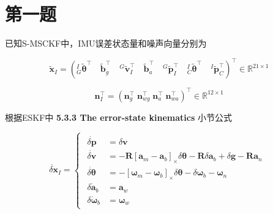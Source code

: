\documentclass[12pt,a4paper]{article}
\begin{document}
\maketitle

\noindent
\setlength{\parindent}{2em}
\setlength{\parskip}{0.3em}

\section*{第一题}

已知S-MSCKF中，IMU误差状态量和噪声向量分别为

\begin{equation}
\tilde{\mathbf{x}}_{I} = 
\left(
{}^I_G \tilde{\boldsymbol{\theta}}^\top \quad 
\tilde{\mathbf{b}}_g^\top \quad 
{}^G\tilde{\mathbf{v}}^\top_I \quad 
\tilde{\mathbf{b}}_a^\top \quad
{}^G\tilde{\mathbf{p}}^\top_I \quad
{}^I_C \tilde{\boldsymbol{\theta}}^\top \quad
{}^I\tilde{\mathbf{p}}^\top_C
\right)^\top 
\in \mathbb{R}^{21 \times 1}
\end{equation}

\begin{equation}
\mathbf{n}_I^\top = 
\left(\mathbf{n}_g^\top \; \mathbf{n}_{wg}^\top \; \mathbf{n}_a^\top \; \mathbf{n}_{wa}^\top\right)^\top
\in \mathbb{R}^{12 \times 1}
\end{equation}

根据ESKF中 \textbf{5.3.3 The error-state kinematics} 小节公式

\begin{equation}
\label{equ:imu_diff_func_error_state}
\dot{\delta \mathbf{x}}_{I} = 
\begin{cases}
\begin{aligned}
\dot{\delta \mathbf{p}} &= \delta \mathbf{v} \\
\dot{\delta \mathbf{v}} &= -\mathbf{R}\left[\mathbf{a}_{m}-\mathbf{a}_{b}\right]_{ \times} \delta \boldsymbol{\theta}-\mathbf{R} \delta \mathbf{a}_{b}+\delta \mathbf{g}-\mathbf{R} \mathbf{a}_{n} \\
\dot{\delta \boldsymbol{\theta}} &= -\left[\boldsymbol{\omega}_{m}-\boldsymbol{\omega}_{b}\right]_{ \times} \delta \boldsymbol{\theta}-\delta \boldsymbol{\omega}_{b}-\boldsymbol{\omega}_{n} \\
\delta \dot{\mathbf{a}}_{b} &= \mathbf{a}_{w} \\ 
\delta \dot{\boldsymbol{\omega}}_{b} &= \boldsymbol{\omega}_{w}
\end{aligned}
\end{cases}
\end{equation}
\end{document}
